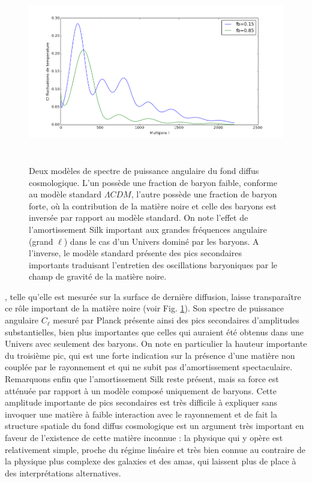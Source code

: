 \begin{figure}[htbp]
	\centering
		\includegraphics[height=8cm]{figs/cl_silk.png}
	\caption{Deux modèles de spectre de puissance angulaire du fond diffus cosmologique. L'un possède une fraction de baryon faible, conforme au modèle standard $\Lambda CDM$, l'autre possède une fraction de baryon forte, où la contribution de la matière noire et celle des baryons est inversée par rapport au modèle standard. On note l'effet de l'amortissement Silk important aux grandes fréquences angulaire (grand $\ell$) dans le cas d'un Univers dominé par les baryons. A l'inverse, le modèle standard présente des pics secondaires importants traduisant l'entretien des oscillations baryoniques par le champ de gravité de la matière noire.} 
	\label{f:cl_silk}
\end{figure}

, telle qu'elle est mesurée sur la surface de dernière diffusion, laisse transparaître ce rôle important de la matière noire (voir Fig. \ref{f:cl_silk}). Son spectre de puissance angulaire $C_\ell$ mesuré par Planck présente ainsi des pics secondaires d'amplitudes substantielles, bien plus importantes que celles qui auraient été obtenus dans une Univers avec seulement des baryons. On note en particulier la hauteur importante du troisième pic, qui est une forte indication sur la présence d'une matière non couplée par le rayonnement et qui ne subit pas d'amortissement spectaculaire. Remarquons enfin que l'amortissement Silk reste présent, mais sa force est atténuée par rapport à un modèle composé uniquement de baryons. Cette amplitude importante de pics secondaires est très difficile à expliquer sans invoquer une matière à faible interaction avec le rayonnement et de fait la structure spatiale du fond diffus cosmologique est un argument très important en faveur de l'existence de cette matière inconnue : la physique qui y opère est relativement simple, proche du régime linéaire et très bien connue au contraire de la physique plus complexe des galaxies et des amas, qui laissent plus de place à des interprétations alternatives.

